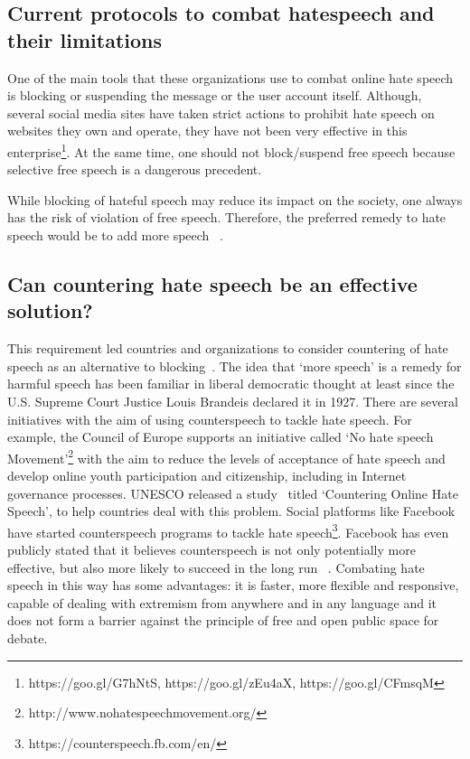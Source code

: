 \documentclass[11pt,a4paper]{article}
\begin{document}
\subsection{Current protocols to combat hatespeech and their limitations} 
One of the main tools that these organizations use to combat online hate speech is blocking or suspending the message or the user account itself. Although, several social media sites have taken strict actions to prohibit hate speech on websites they own and operate, they have not been very effective in this enterprise\footnote{https://goo.gl/G7hNtS, https://goo.gl/zEu4aX, https://goo.gl/CFmsqM}. At the same time, one should not block/suspend free speech because selective free speech is a dangerous precedent. 



While blocking of hateful speech may reduce its impact on the society, one always has the risk of violation of free speech. Therefore, the preferred remedy to hate speech would be to add more speech ~\cite{richards2000counterspeech}.
\subsection{Can countering hate speech be an effective solution?}
This requirement led countries and organizations to consider countering of hate speech as an alternative to blocking~\cite{gagliardone2015countering}. The idea that `more speech' is a remedy for harmful speech has been familiar in liberal democratic thought at least since the U.S. Supreme Court Justice Louis Brandeis declared it in 1927. There are several initiatives with the aim of using counterspeech to tackle hate speech. For example, the Council of Europe supports an initiative called `No hate speech Movement'\footnote{\label{nohatespeechmovement}http://www.nohatespeechmovement.org/} with the aim to reduce the levels of acceptance of hate speech and develop online youth participation and citizenship, including in Internet governance processes. UNESCO released a study~\cite{gagliardone2015countering} titled `Countering Online Hate Speech', to help countries deal with this problem. Social platforms like Facebook have started counterspeech programs to tackle hate speech\footnote{\label{counterfb}https://counterspeech.fb.com/en/}. Facebook has even publicly stated that it believes counterspeech is not only potentially more effective, but also more likely to succeed in the long run ~\cite{bartlett2015counter}. Combating hate speech in this way has some advantages: it is faster, more flexible and responsive, capable of dealing with extremism from anywhere and in any language and it does not form a barrier against the principle of free and open public space for debate. 
\end{document}
